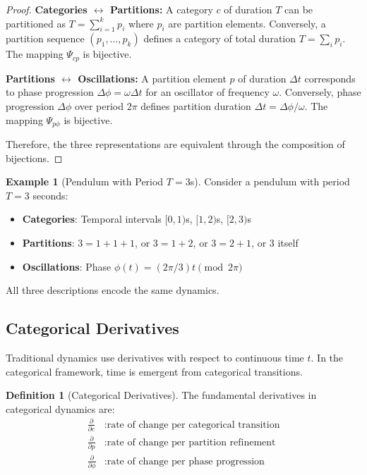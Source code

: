 \documentclass[11pt,twocolumn,a4paper]{article}
\theoremstyle{definition}
\newtheorem{definition}[theorem]{Definition}
\newtheorem{example}[theorem]{Example}
\theoremstyle{remark}
\begin{document}
\begin{proof}
\textbf{Categories $\leftrightarrow$ Partitions:} A category $c$ of duration $T$ can be partitioned as $T = \sum_{i=1}^k p_i$ where $p_i$ are partition elements. Conversely, a partition sequence $(p_1,\ldots,p_k)$ defines a category of total duration $T = \sum_i p_i$. The mapping $\Psi_{cp}$ is bijective.

\textbf{Partitions $\leftrightarrow$ Oscillations:} A partition element $p$ of duration $\Delta t$ corresponds to phase progression $\Delta\phi = \omega \Delta t$ for an oscillator of frequency $\omega$. Conversely, phase progression $\Delta\phi$ over period $2\pi$ defines partition duration $\Delta t = \Delta\phi/\omega$. The mapping $\Psi_{p\phi}$ is bijective.

Therefore, the three representations are equivalent through the composition of bijections.
\end{proof}

\begin{example}[Pendulum with Period $T=3$s]
\label{ex:pendulum_triple}
Consider a pendulum with period $T = 3$ seconds:
\begin{itemize}
\item \textbf{Categories}: Temporal intervals $[0,1)$s, $[1,2)$s, $[2,3)$s
\item \textbf{Partitions}: $3 = 1+1+1$, or $3 = 1+2$, or $3 = 2+1$, or $3$ itself
\item \textbf{Oscillations}: Phase $\phi(t) = (2\pi/3) t \pmod{2\pi}$
\end{itemize}
All three descriptions encode the same dynamics.
\end{example}

\subsection{Categorical Derivatives}

Traditional dynamics use derivatives with respect to continuous time $t$. In the categorical framework, time is emergent from categorical transitions.

\begin{definition}[Categorical Derivatives]
\label{def:categorical_derivatives}
The fundamental derivatives in categorical dynamics are:
\begin{align}
\frac{\partial}{\partial c} &: \text{rate of change per categorical transition} \label{eq:deriv_c} \\
\frac{\partial}{\partial p} &: \text{rate of change per partition refinement} \label{eq:deriv_p} \\
\frac{\partial}{\partial \phi} &: \text{rate of change per phase progression} \label{eq:deriv_phi}
\end{align}
\end{definition}
\end{document}
